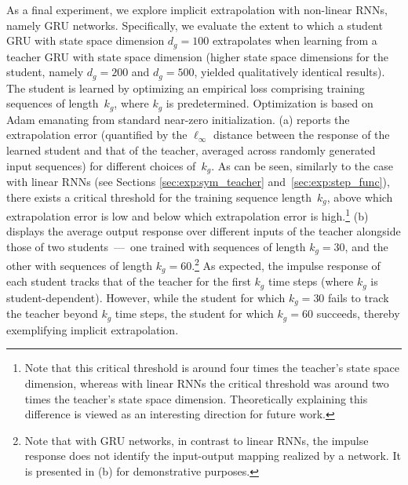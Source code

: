 As a final experiment, we explore implicit extrapolation with non-linear RNNs, namely GRU networks.
Specifically, we evaluate the extent to which a student GRU with state space dimension $d_g = 100$ extrapolates when learning from a teacher GRU with state space dimension  (higher state space dimensions for the student, namely $d_g = 200$ and $d_g = 500$, yielded qualitatively identical results).
The student is learned by optimizing an empirical loss comprising training sequences of length~$k_g$, where $k_g$ is predetermined.
Optimization is based on Adam emanating from standard near-zero initialization.
(a) reports the extrapolation error (quantified by the $\ell_\infty$ distance between the response of the learned student and that of the teacher, averaged across randomly generated input sequences) for different choices of~$k_g$.
As can be seen, similarly to the case with linear RNNs (see Sections \ref{sec:exp:sym_teacher} and~\ref{sec:exp:step_func}), there exists a critical threshold for the training sequence length~$k_g$, above which extrapolation error is low and below which extrapolation error is high.\footnote{%
Note that this critical threshold is around four times the teacher's state space dimension, whereas with linear RNNs the critical threshold was around two times the teacher's state space dimension.
Theoretically explaining this difference is viewed as an interesting direction for future work.
}
(b) displays the average output response over different inputs of the teacher alongside those of two students~---~one trained with sequences of length $k_g = 30$, and the other with sequences of length $k_g = 60$.\footnote{%
Note that with GRU networks, in contrast to linear RNNs, the impulse response does not identify the input-output mapping realized by a network.
It is presented in (b) for demonstrative purposes.
}
As expected, the impulse response of each student tracks that of the teacher for the first $k_g$ time steps (where $k_g$ is student-dependent).
However, while the student for which $k_g = 30$ fails to track the teacher beyond $k_g$ time steps, the student for which $k_g = 60$ succeeds, thereby exemplifying implicit extrapolation. %


